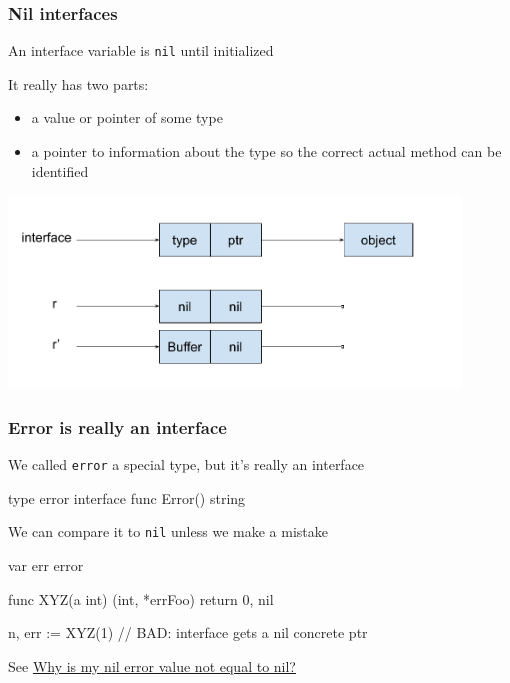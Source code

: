 \documentclass[handout,compress,t,11pt]{beamer}
\begin{document}
\begin{frame}[fragile]
    \frametitle{Nil interfaces}
    An interface variable is \verb|nil| until initialized \par
    \vspace{0.4\baselineskip}
    It really has two parts:
    \begin{itemize}
        \item a value or pointer of some type
        \item a pointer to information about the type so
              the correct actual method can be identified
    \end{itemize}
\begin{center}
    \includegraphics[width=0.9\textwidth]{interface-picture.pdf}
\end{center}
\end{frame}

\begin{frame}[fragile]
    \frametitle{Error is really an interface}
    We called \verb|error| a special type, but it's really an interface \par
\begin{golang}
type error interface {
    func Error() string
}
\end{golang}
    \vspace{0.6\baselineskip}
    We can compare it to \verb|nil| unless we make a mistake \par
\begin{golang}
var err error

func XYZ(a int) (int, *errFoo) {
    return 0, nil
}

n, err := XYZ(1)   // BAD: interface gets a nil concrete ptr
\end{golang}
\vspace{0.6\baselineskip}
See \href{https://golang.org/doc/faq#nil_error}{Why is my nil error value not equal to nil?}
\end{frame}
\end{document}
